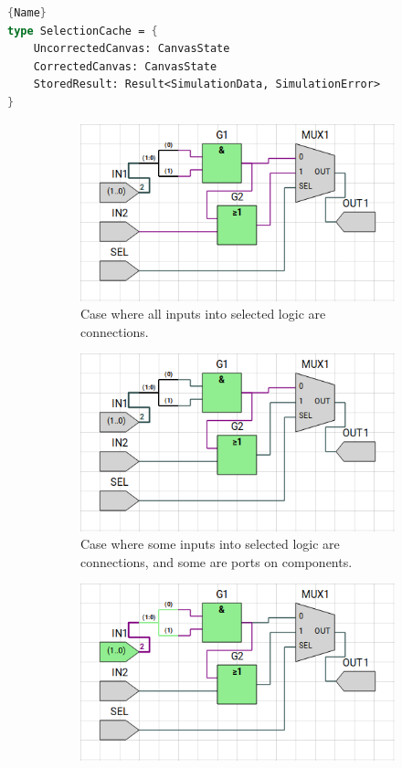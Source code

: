 \begin{lstlisting}[caption=Type Definition of Cache for selected logic ,frame=tlrb, language=FSharp, label=lst:selcache]{Name}
type SelectionCache = {
    UncorrectedCanvas: CanvasState
    CorrectedCanvas: CanvasState
    StoredResult: Result<SimulationData, SimulationError>
}
\end{lstlisting}
\begin{figure} [h]
    \begin{subfigure}{0.48\textwidth}
        \centering
        \includegraphics[width=0.8\linewidth]{05.ImpPlan/SelCase1.png}
        \caption{Case where all inputs into selected logic are connections.}
        \label{subfig:SelCase1}
    \end{subfigure}
    \begin{subfigure}{0.48\textwidth}
        \centering
        \includegraphics[width=0.8\linewidth]{05.ImpPlan/SelCase2.png}
        \caption{Case where some inputs into selected logic are connections, and some are ports on components.}
        \label{subfig:SelCase2}
    \end{subfigure}
    \newline
    \begin{subfigure}{0.48\textwidth}
        \centering
        \includegraphics[width=0.8\linewidth]{05.ImpPlan/SelCase3.png}

\end{subfigure}
\end{figure}
